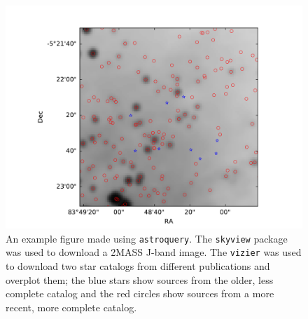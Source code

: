 \documentclass[twocolumn]{aastex62}
\newcommand{\package}[1]{\texttt{#1}\xspace}
\newcommand{\astroquery}{\package{astroquery}}
\begin{document}
\newpage



\begin{figure}[!htp]
\includegraphics[scale=1,width=7in]{example_figure_1.pdf}
\caption{An example figure made using \astroquery.  The \texttt{skyview} package
was used to download a 2MASS J-band image.  The \texttt{vizier} was used to
download two star catalogs from different publications and overplot them; the
blue stars show sources from the older, less complete catalog and the red
circles show sources from a more recent, more complete catalog.
}
\label{fig:example1}
\end{figure}
\end{document}
